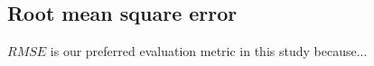 \documentclass[a4paper,10pt]{article}
\begin{document}
% 
% 
% 



\subsection{Root mean square error}
$RMSE$ is our preferred evaluation metric in this study because...
\end{document}
